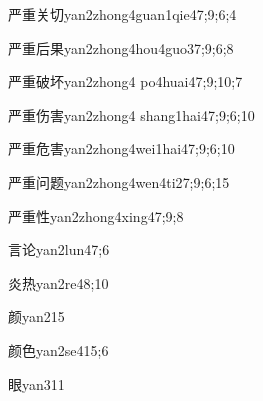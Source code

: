 \begin{verbete}{严重关切}{yan2zhong4guan1qie4}{7;9;6;4}
\end{verbete}

\begin{verbete}{严重后果}{yan2zhong4hou4guo3}{7;9;6;8}
\end{verbete}

\begin{verbete}{严重破坏}{yan2zhong4 po4huai4}{7;9;10;7}
\end{verbete}

\begin{verbete}{严重伤害}{yan2zhong4 shang1hai4}{7;9;6;10}
\end{verbete}

\begin{verbete}{严重危害}{yan2zhong4wei1hai4}{7;9;6;10}
\end{verbete}

\begin{verbete}{严重问题}{yan2zhong4wen4ti2}{7;9;6;15}
\end{verbete}

\begin{verbete}{严重性}{yan2zhong4xing4}{7;9;8}
\end{verbete}

\begin{verbete}{言论}{yan2lun4}{7;6}
\end{verbete}

\begin{verbete}{炎热}{yan2re4}{8;10}
\end{verbete}

\begin{verbete}{颜}{yan2}{15}
\end{verbete}

\begin{verbete}{颜色}{yan2se4}{15;6}
\end{verbete}

\begin{verbete}{眼}{yan3}{11}
\end{verbete}

